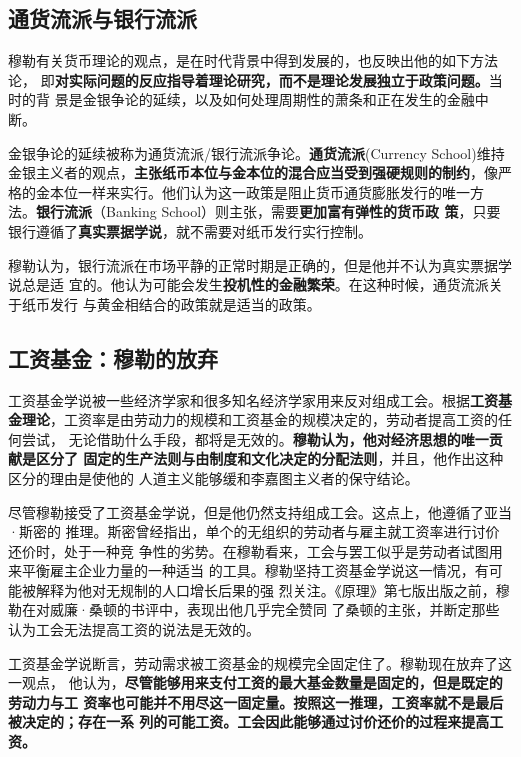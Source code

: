 \subsection{通货流派与银行流派}

穆勒有关货币理论的观点，是在时代背景中得到发展的，也反映出他的如下方法论，
即\textbf{对实际问题的反应指导着理论研究，而不是理论发展独立于政策问题。}当时的背
景是金银争论的延续，以及如何处理周期性的萧条和正在发生的金融中断。

金银争论的延续被称为通货流派/银行流派争论。\textbf{通货流派}(Currency School)维持
金银主义者的观点，\textbf{主张纸币本位与金本位的混合应当受到强硬规则的制约}，像严
格的金本位一样来实行。他们认为这一政策是阻止货币通货膨胀发行的唯一方
法。\textbf{银行流派}（Banking School）则主张，需要\textbf{更加富有弹性的货币政
  策}，只要银行遵循了\textbf{真实票据学说}，就不需要对纸币发行实行控制。

穆勒认为，银行流派在市场平静的正常时期是正确的，但是他并不认为真实票据学说总是适
宜的。他认为可能会发生\textbf{投机性的金融繁荣}。在这种时候，通货流派关于纸币发行
与黄金相结合的政策就是适当的政策。

\subsection{工资基金：穆勒的放弃}

工资基金学说被一些经济学家和很多知名经济学家用来反对组成工会。根据\textbf{工资基
  金理论}，工资率是由劳动力的规模和工资基金的规模决定的，劳动者提高工资的任何尝试，
无论借助什么手段，都将是无效的。\textbf{穆勒认为，他对经济思想的唯一贡献是区分了
  固定的生产法则与由制度和文化决定的分配法则}，并且，他作出这种区分的理由是使他的
人道主义能够缓和李嘉图主义者的保守结论。

尽管穆勒接受了工资基金学说，但是他仍然支持组成工会。这点上，他遵循了亚当·斯密的
推理。斯密曾经指出，单个的无组织的劳动者与雇主就工资率进行讨价还价时，处于一种竞
争性的劣势。在穆勒看来，工会与罢工似乎是劳动者试图用来平衡雇主企业力量的一种适当
的工具。穆勒坚持工资基金学说这一情况，有可能被解释为他对无规制的人口增长后果的强
烈关注。《原理》第七版出版之前，穆勒在对威廉·桑顿的书评中，表现出他几乎完全赞同
了桑顿的主张，并断定那些认为工会无法提高工资的说法是无效的。

工资基金学说断言，劳动需求被工资基金的规模完全固定住了。穆勒现在放弃了这一观点，
他认为，\textbf{尽管能够用来支付工资的最大基金数量是固定的，但是既定的劳动力与工
  资率也可能并不用尽这一固定量。按照这一推理，工资率就不是最后被决定的；存在一系
  列的可能工资。工会因此能够通过讨价还价的过程来提高工资。}

